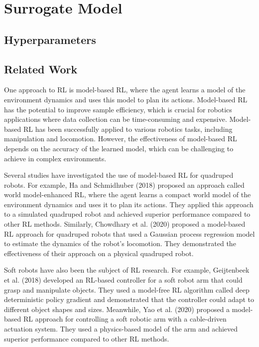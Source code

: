 \section{Surrogate Model}

\subsection{Hyperparameters}

\subsection{Related Work}

One approach to RL is model-based RL, where the agent learns a model of the environment dynamics and uses this model to plan its actions. Model-based RL has the potential to improve sample efficiency, which is crucial for robotics applications where data collection can be time-consuming and expensive. Model-based RL has been successfully applied to various robotics tasks, including manipulation and locomotion. However, the effectiveness of model-based RL depends on the accuracy of the learned model, which can be challenging to achieve in complex environments.

Several studies have investigated the use of model-based RL for quadruped robots. For example, Ha and Schmidhuber (2018) proposed an approach called world model-enhanced RL, where the agent learns a compact world model of the environment dynamics and uses it to plan its actions. They applied this approach to a simulated quadruped robot and achieved superior performance compared to other RL methods. Similarly, Chowdhary et al. (2020) proposed a model-based RL approach for quadruped robots that used a Gaussian process regression model to estimate the dynamics of the robot's locomotion. They demonstrated the effectiveness of their approach on a physical quadruped robot.

Soft robots have also been the subject of RL research. For example, Geijtenbeek et al. (2018) developed an RL-based controller for a soft robot arm that could grasp and manipulate objects. They used a model-free RL algorithm called deep deterministic policy gradient and demonstrated that the controller could adapt to different object shapes and sizes. Meanwhile, Yao et al. (2020) proposed a model-based RL approach for controlling a soft robotic arm with a cable-driven actuation system. They used a physics-based model of the arm and achieved superior performance compared to other RL methods.

